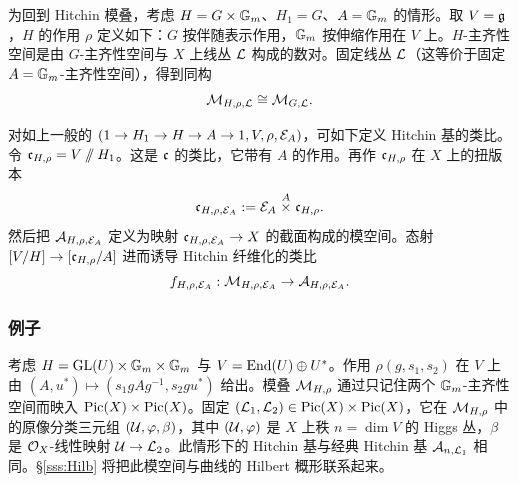 为回到 Hitchin 模叠，考虑 $H=G\times\mathbb{G}_m$、$H_{1}=G$、$A=\mathbb{G}_m$ 的情形。取 $V=\mathfrak{g}$，$H$ 的作用 $\rho$ 定义如下：$G$ 按伴随表示作用，$\mathbb{G}_m$ 按伸缩作用在 $V$ 上。$H$-主齐性空间是由 $G$-主齐性空间与 $X$ 上线丛 $\mathcal{L}$ 构成的数对。固定线丛 $\mathcal{L}$（这等价于固定 $A=\mathbb{G}_m$-主齐性空间），得到同构
\begin{equation*}
\mathcal{M}_{H,\rho, \mathcal{L}}\cong\mathcal{M}_{G, \mathcal{L}}.
\end{equation*}

对如上一般的 $(1\to H_{1}\to H\to A\to 1,V,\rho,\mathcal{E}_{A})$，可如下定义 Hitchin 基的类比。令 $\mathfrak{c}_{H,\rho}=V\sslash H_{1}$。这是 $\mathfrak{c}$ 的类比，它带有 $A$ 的作用。再作 $\mathfrak{c}_{H,\rho}$ 在 $X$ 上的扭版本
\begin{equation*}
\mathfrak{c}_{H,\rho,\mathcal{E}_{A}}:=\mathcal{E}_{A}\stackrel{A}{\times}\mathfrak{c}_{H,\rho}.
\end{equation*}
然后把 $\mathcal{A}_{H,\rho,\mathcal{E}_{A}}$ 定义为映射 $\mathfrak{c}_{H,\rho,\mathcal{E}_{A}}\to X$ 的截面构成的模空间。态射 $[V/H]\to [\mathfrak{c}_{H,\rho}/A]$ 进而诱导 Hitchin 纤维化的类比
\begin{equation*}
f_{H,\rho,\mathcal{E}_{A}}: \mathcal{M}_{H,\rho,\mathcal{E}_{A}}\to \mathcal{A}_{H,\rho,\mathcal{E}_{A}}.
\end{equation*}

\subsubsection{例子}\label{sss:MHilb} 考虑 $H=\textup{GL}(U)\times\mathbb{G}_m\times\mathbb{G}_m$ 与 $V=\textup{End}(U)\oplus U^{*}$。作用 $\rho(g,s_{1}, s_{2})$ 在 $V$ 上由 $(A,u^{*})\mapsto (s_{1}gAg^{-1}, s_{2}gu^{*})$ 给出。模叠 $\mathcal{M}_{H,\rho}$ 通过只记住两个 $\mathbb{G}_m$-主齐性空间而映入 $\textup{Pic}(X)\times\textup{Pic}(X)$。固定 $(\mathcal{L}_{1},\mathcal{L}_{2})\in \textup{Pic}(X)\times\textup{Pic}(X)$，它在 $\mathcal{M}_{H,\rho}$ 中的原像分类三元组 $(\mathcal{U},\varphi,\beta)$，其中 $(\mathcal{U},\varphi)$ 是 $X$ 上秩 $n=\dim V$ 的 Higgs 丛，$\beta$ 是 $\mathcal{O}_{X}$-线性映射 $\mathcal{U}\to \mathcal{L}_{2}$。此情形下的 Hitchin 基与经典 Hitchin 基 $\mathcal{A}_{n,\mathcal{L}_{1}}$ 相同。\S\ref{sss:Hilb} 将把此模空间与曲线的 Hilbert 概形联系起来。
